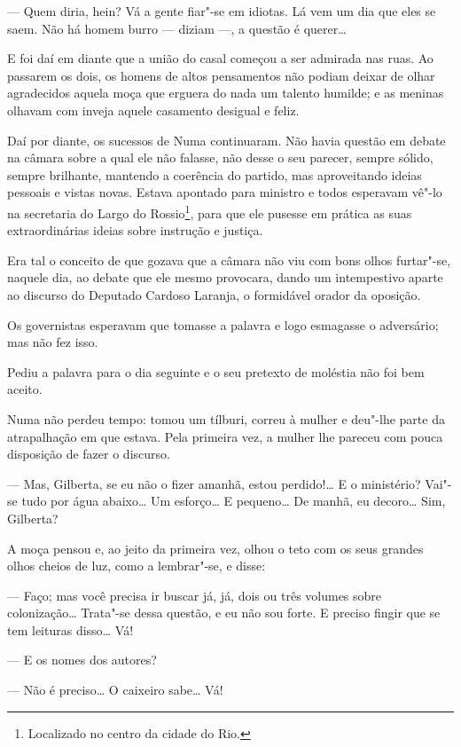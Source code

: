 --- Quem diria, hein? Vá a gente fiar"-se em idiotas. Lá vem um dia que
eles se saem. Não há homem burro --- diziam ---, a questão é querer\ldots{}

E foi daí em diante que a união do casal começou a ser admirada nas
ruas. Ao passarem os dois, os homens de altos pensamentos não podiam
deixar de olhar agradecidos aquela moça que erguera do nada um talento
humilde; e as meninas olhavam com inveja aquele casamento desigual e
feliz.

Daí por diante, os sucessos de Numa continuaram. Não havia questão em
debate na câmara sobre a qual ele não falasse, não desse o seu parecer,
sempre sólido, sempre brilhante, mantendo a coerência do partido, mas
aproveitando ideias pessoais e vistas novas. Estava apontado para
ministro e todos esperavam vê"-lo na secretaria do Largo do
Rossio\footnote{Localizado no centro da cidade do Rio.}, para que ele
pusesse em prática as suas extraordinárias ideias sobre instrução e
justiça.

Era tal o conceito de que gozava que a câmara não viu com bons olhos
furtar"-se, naquele dia, ao debate que ele mesmo provocara, dando um
intempestivo aparte ao discurso do Deputado Cardoso Laranja, o
formidável orador da oposição.

Os governistas esperavam que tomasse a palavra e logo esmagasse o
adversário; mas não fez isso.

Pediu a palavra para o dia seguinte e o seu pretexto de moléstia não foi
bem aceito.

Numa não perdeu tempo: tomou um tílburi, correu à mulher e deu"-lhe parte
da atrapalhação em que estava. Pela primeira vez, a mulher lhe pareceu
com pouca disposição de fazer o discurso.

--- Mas, Gilberta, se eu não o fizer amanhã, estou perdido!\ldots{} E o
ministério? Vai"-se tudo por água abaixo\ldots{} Um esforço\ldots{} E
pequeno\ldots{} De manhã, eu decoro\ldots{} Sim, Gilberta?

A moça pensou e, ao jeito da primeira vez, olhou o teto com os seus
grandes olhos cheios de luz, como a lembrar"-se, e disse:

--- Faço; mas você precisa ir buscar já, já, dois ou três volumes sobre
colonização\ldots{} Trata"-se dessa questão, e eu não sou forte. E
preciso fingir que se tem leituras disso\ldots{} Vá!

--- E os nomes dos autores?

--- Não é preciso\ldots{} O caixeiro sabe\ldots{} Vá!

